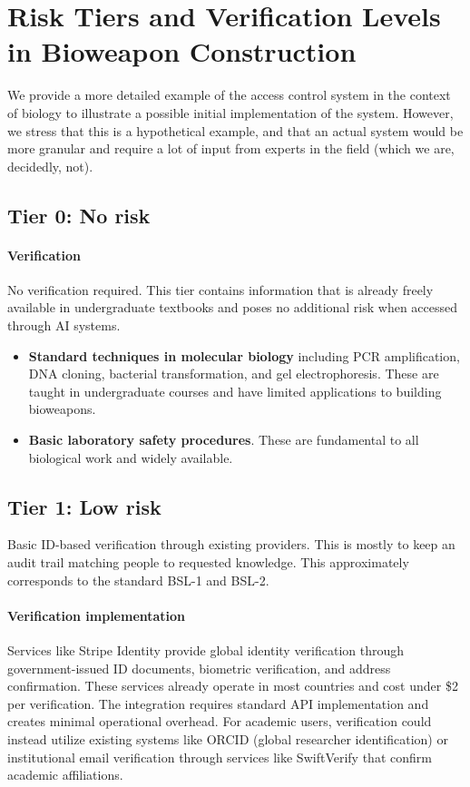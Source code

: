 \documentclass{article}
\theoremstyle{plain}
\theoremstyle{definition}
\theoremstyle{remark}
\begin{document}
\section{Risk Tiers and Verification Levels in Bioweapon Construction}

We provide a more detailed example of the access control system in the context of biology to illustrate a possible initial implementation of the system.
However, we stress that this is a hypothetical example, and that an actual system would be more granular and require a lot of input from experts in the field (which we are, decidedly, not).

\subsection{Tier 0: No risk}

\paragraph{Verification} No verification required. This tier contains information that is already freely available in undergraduate textbooks and poses no additional risk when accessed through AI systems.

\begin{itemize}
  \item \textbf{Standard techniques in molecular biology} including PCR amplification, DNA cloning, bacterial transformation, and gel electrophoresis. These are taught in undergraduate courses and have limited applications to building bioweapons.
  \item \textbf{Basic laboratory safety procedures}. These are fundamental to all biological work and widely available.
\end{itemize}

\subsection{Tier 1: Low risk}

Basic ID-based verification through existing providers. This is mostly to keep an audit trail matching people to requested knowledge. This approximately corresponds to the standard BSL-1 and BSL-2.

\paragraph{Verification implementation} Services like Stripe Identity provide global identity verification through government-issued ID documents, biometric verification, and address confirmation. These services already operate in most countries and cost under \$2 per verification. The integration requires standard API implementation and creates minimal operational overhead. For academic users, verification could instead utilize existing systems like ORCID (global researcher identification) or institutional email verification through services like SwiftVerify that confirm academic affiliations.
\end{document}
